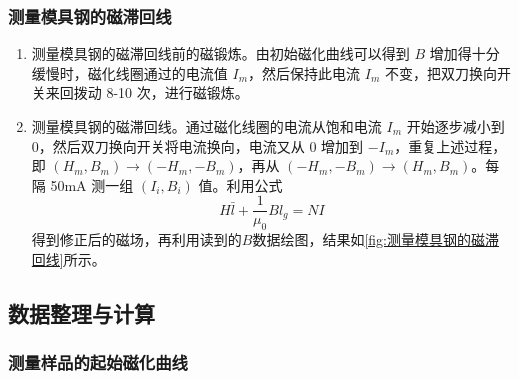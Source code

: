 \documentclass[zihao=5, UTF8]{article}
\theoremstyle{MyLineTheoremStyle} %
\theoremstyle{MyBlockTheoremStyle} %
\theoremstyle{MySubsubsectionStyle} %
\begin{document}
\subsubsection{测量模具钢的磁滞回线}
\begin{enumerate}
    \item 测量模具钢的磁滞回线前的磁锻炼。由初始磁化曲线可以得到 $B$ 增加得十分缓慢时，磁化线圈通过的电流值 $I_m$，然后保持此电流 $I_m$ 不变，把双刀换向开关来回拨动 8-10 次，进行磁锻炼。
    \item 测量模具钢的磁滞回线。通过磁化线圈的电流从饱和电流 $I_m$ 开始逐步减小到 0，然后双刀换向开关将电流换向，电流又从 0 增加到 $-I_m$，重复上述过程，即 $(H_m, B_m) \rightarrow (-H_m, -B_m)$，再从 $(-H_m, -B_m) \rightarrow (H_m, B_m)$。每隔 50mA 测一组 $(I_i, B_i)$ 值。利用公式$$H\bar l + \frac{1}{\mu_0}Bl_g = NI$$得到修正后的磁场，再利用读到的$B$数据绘图，结果如\ref{fig:测量模具钢的磁滞回线}所示。
\end{enumerate}

\subsection{数据整理与计算}
\subsubsection{测量样品的起始磁化曲线}
\end{document}
